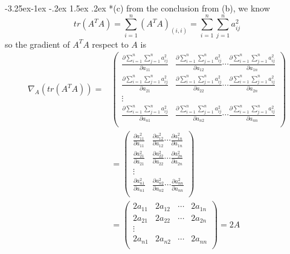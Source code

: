 \documentclass[12pt]{article}
\makeatletter
\renewcommand\subsection{\@startsection{subsection}{2}{\z@}%
	{-3.25ex\@plus -1ex \@minus -.2ex}%
	{1.5ex \@plus .2ex}%
	{\normalfont\large\bfseries}}%
\makeatother
\begin{document}
	\subsection*{(c)}
	from the conclusion from (b), we know
	\begin{equation}\label{aa_ii}
	tr(A^TA)=\sum_{i=1}^n (A^TA)_{(i,i)}=\sum_{i=1}^n\sum_{j=1}^n a_{ij}^2
	\end{equation}
	so the gradient of $A^TA$ respect to $A$ is
	\begin{equation}\label{trAA_grad}
	\begin{split}
	\nabla_A(tr(A^TA))=&
	\left(  
	\begin{array}{cccc}
	\frac{\partial\sum_{i=1}^n\sum_{j=1}^n a_{ij}^2}{\partial a_{11}} & \frac{\partial\sum_{i=1}^n\sum_{j=1}^n a_{ij}^2}{\partial a_{12}} \cdots \frac{\partial\sum_{i=1}^n\sum_{j=1}^n a_{ij}^2}{\partial a_{1n}}\\
	\frac{\partial\sum_{i=1}^n\sum_{j=1}^n a_{ij}^2}{\partial a_{21}} & \frac{\partial\sum_{i=1}^n\sum_{j=1}^n a_{ij}^2}{\partial a_{22}} \cdots \frac{\partial\sum_{i=1}^n\sum_{j=1}^n a_{ij}^2}{\partial a_{2n}}\\
	\vdots \\
	\frac{\partial\sum_{i=1}^n\sum_{j=1}^n a_{ij}^2}{\partial a_{n1}} & \frac{\partial\sum_{i=1}^n\sum_{j=1}^n a_{ij}^2}{\partial a_{n2}} \cdots \frac{\partial\sum_{i=1}^n\sum_{j=1}^n a_{ij}^2}{\partial a_{nn}}\\	
	\end{array}
	\right)\\
	&=
	\left(  
	\begin{array}{cccc}
	\frac{\partial a_{11}^2}{\partial a_{11}} & \frac{\partial a_{12}^2}{\partial a_{12}} \cdots \frac{\partial a_{1n}^2}{\partial a_{1n}}\\
	\frac{\partial a_{21}^2}{\partial a_{21}} & \frac{\partial a_{22}^2}{\partial a_{22}} \cdots \frac{\partial a_{2n}^2}{\partial a_{2n}}\\
	\vdots \\
	\frac{\partial a_{n1}^2}{\partial a_{n1}} & \frac{\partial a_{n2}^2}{\partial a_{n2}} \cdots \frac{\partial a_{nn}^2}{\partial a_{nn}}\\	
	\end{array}
	\right)\\
	&=
	\left(
	\begin{array}{cccc}	
	2a_{11} & 2a_{12} & \cdots & 2a_{1n}\\
	2a_{21} & 2a_{22} & \cdots & 2a_{2n}\\
	\vdots \\
	2a_{n1} & 2a_{n2} & \cdots & 2a_{nn}\\
	\end{array}
	\right)
	=2A
	\end{split}
	\end{equation}
	
\end{document}
